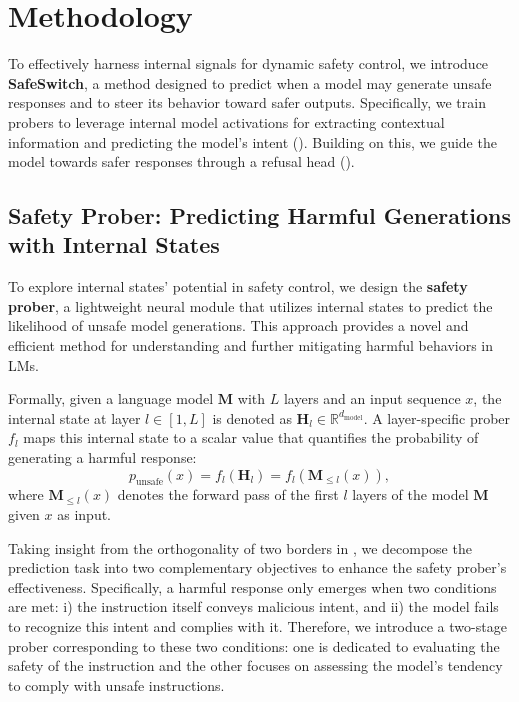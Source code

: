 \section{Methodology}
To effectively harness internal signals for dynamic safety control, we introduce \textbf{SafeSwitch}, a method designed to predict when a model may generate unsafe responses and to steer its behavior toward safer outputs. Specifically, we train probers to leverage internal model activations for extracting contextual information and predicting the model's intent (). Building on this, we guide the model towards safer responses through a refusal head ().


\subsection{Safety Prober: Predicting Harmful Generations with Internal States}
\label{sec:build_probers}
 
To explore internal states' potential in safety control, we design the \textbf{safety prober}, a lightweight neural module that utilizes internal states to predict the likelihood of unsafe model generations. This approach provides a novel and efficient method for understanding and further mitigating harmful behaviors in LMs.

Formally, given a language model $\mathbf{M}$ with $L$ layers and an input sequence $x$, the internal state at layer $l \in [1, L]$ is denoted as $\mathbf{H}_{l} \in \mathbb{R}^{d_{\text{model}}}$. A layer-specific prober $f_{l}$ maps this internal state to a scalar value that quantifies the probability of generating a harmful response:
\begin{equation}
\label{eq:prober}
p_{\text{unsafe}}(x) = f_{l}(\mathbf{H}_{l}) = f_{l}(\mathbf{M}_{\leq l}(x)),
\end{equation}
where $\mathbf{M}_{\leq l}(x)$ denotes the forward pass of the first $l$ layers of the model $\mathbf{M}$ given $x$ as input.

Taking insight from the orthogonality of two borders in , we decompose the prediction task into two complementary objectives to enhance the safety prober's effectiveness. Specifically, a harmful response only emerges when two conditions are met: i) the instruction itself conveys malicious intent, and ii) the model fails to recognize this intent and complies with it. Therefore, we introduce a two-stage prober corresponding to these two conditions: one is dedicated to evaluating the safety of the instruction and the other focuses on assessing the model's tendency to comply with unsafe instructions.

